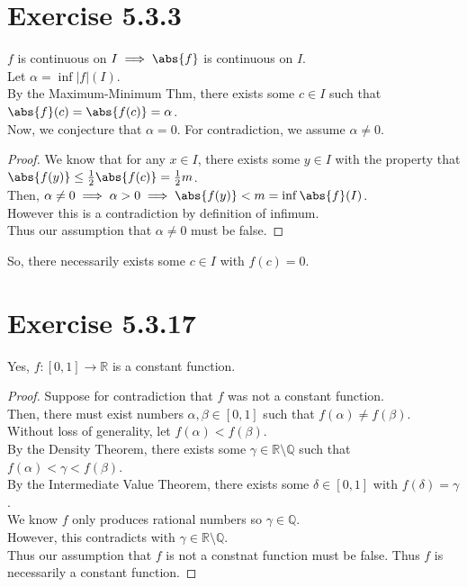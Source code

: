 \documentclass[11pt]{article}
\newcommand{\bbR}{\mathbb{R}}  %
\newcommand{\Q}{\mathbb{Q}}  %
\begin{document}
\section*{Exercise 5.3.3}\vspace{-1em}
    $f$ is continuous on $I \implies \abs{f}$ is continuous on $I$. \\
    Let $\alpha =\inf|f|(I)$. \\
    By the Maximum-Minimum Thm, there exists some $c\in I$ such that $\abs{f}(c)=\abs{f(c)}=\alpha$. \\
    Now, we conjecture that $\alpha=0$. For contradiction, we assume $\alpha\neq 0$. \vspace{-1em}
    \begin{proof}
        We know that for any $x\in I$, there exists some $y\in I$ with the property that $\abs{f(y)}\leq\frac{1}{2}\abs{f(c)}=\frac{1}{2}m$. \\
        Then, $\alpha\neq 0\implies \alpha>0\implies \abs{f(y)} < m = \inf \abs{f}(I)$. \\
        However this is a contradiction by definition of infimum. \\
        Thus our assumption that $\alpha\neq 0$ must be false.
    \end{proof}\vspace{-1em}
    So, there necessarily exists some $c\in I$ with $f(c)=0$.
    \vspace{-1em}

\section*{Exercise 5.3.17}\vspace{-1em}
    Yes, $f:[0,1]\to\bbR$ is a constant function. \vspace{-1em}
    \begin{proof}
    Suppose for contradiction that $f$ was not a constant function. \\
    Then, there must exist numbers $\alpha, \beta \in[0,1]$ such that $f(\alpha)\neq f(\beta)$. \\
    Without loss of generality, let $f(\alpha)<f(\beta)$. \\
    By the Density Theorem, there exists some $\gamma\in\bbR\setminus\Q$ such that $f(\alpha)<\gamma<f(\beta)$. \\
    By the Intermediate Value Theorem, there exists some $\delta\in[0,1]$ with $f(\delta)=\gamma$. \\
    We know $f$ only produces rational numbers so $\gamma\in\Q$. \\
    However, this contradicts with $\gamma\in\bbR\setminus\Q$. \\
    Thus our assumption that $f$ is not a constnat function must be false.
    Thus $f$ is necessarily a constant function.
    \end{proof}
\end{document}
